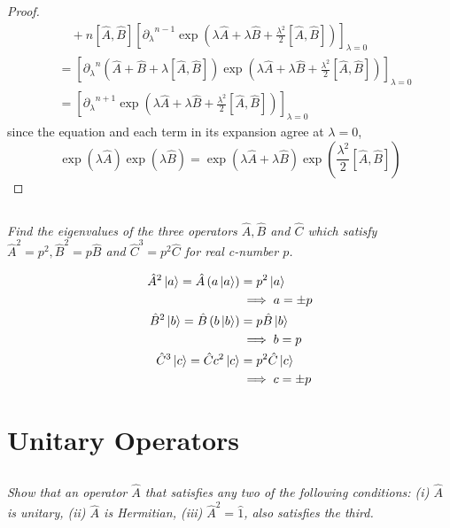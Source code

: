 \documentclass[12pt, letterpaper]{article}
\begin{document}
\begin{proof}
\begin{align*}
        & \quad+n[\hat{A}, \hat{B}]\left[{\partial_\lambda}^{n-1 } \exp \left(\lambda \hat{A}+\lambda \hat{B}+\frac{\lambda^{2}}{2}[\hat{A}, \hat{B}]\right)\right]_{\lambda=0}\\
        &= \left[{\partial_\lambda}^{n }(\hat{A}+\hat{B}+\lambda[\hat{A}, \hat{B}]) \exp \left(\lambda \hat{A}+\lambda \hat{B}+\frac{\lambda^{2}}{2}[\hat{A}, \hat{B}]\right)\right]_{\lambda=0} \\ 
        &= \left[{\partial_\lambda}^{n + 1} \exp \left(\lambda \hat{A}+\lambda \hat{B}+\frac{\lambda^{2}}{2}[\hat{A}, \hat{B}]\right)\right]_{\lambda=0}
    \end{align*}
    since the equation and each term in its expansion agree at $\lambda = 0$, 
    $$
        \boxed{\exp(\lambda \hat{A}) \exp(\lambda \hat{B})=\exp \left(\lambda \hat{A}+\lambda \hat{B} \right)  \exp \left(\frac{\lambda^{2}}{2}[\hat{A}, \hat{B}]\right)}
    $$
\end{proof}


\subsection{}
\textit{Find the eigenvalues of the three operators $\hat{A}, \hat{B}$ and $\hat{C}$ which satisfy $\hat{A}^{2}=p^{2}, \hat{B}^{2}=p \hat{B}$ and $\hat{C}^{3}=p^{2} \hat{C}$ for real c-number $p$.}

\begin{align*}
    \hat{A}^2 \ket a = \hat A \left(a \ket a\right)  &= p ^2 \ket a \\
    &\implies a = \pm p \\
    \hat{B}^2 \ket b = \hat{B} \left(b \ket b \right)  &= p \hat B \ket b \\
     &\implies b = p \\
    \hat{C}^3 \ket c=\hat{C} c^2 \ket c  &= p^2 \hat{C} \ket c \\
     &\implies c = \pm p \\
\end{align*}

\section{Unitary Operators}
\subsection{}
\textit{Show that an operator $\hat{A}$ that satisfies any two of the following conditions: (i) $\hat{A}$ is unitary, (ii) $\hat{A}$ is Hermitian, (iii) $\hat{A}^2 =\hat{1}$, also satisfies the third. }
\end{document}
